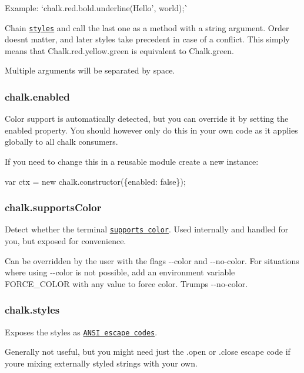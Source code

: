 Example\+: `chalk.\+red.\+bold.\+underline(\textquotesingle{}Hello', \textquotesingle{}world\textquotesingle{});\`{}

Chain \href{#styles}{\tt styles} and call the last one as a method with a string argument. Order doesn\textquotesingle{}t matter, and later styles take precedent in case of a conflict. This simply means that {\ttfamily Chalk.\+red.\+yellow.\+green} is equivalent to {\ttfamily Chalk.\+green}.

Multiple arguments will be separated by space.

\subsubsection*{chalk.\+enabled}

Color support is automatically detected, but you can override it by setting the {\ttfamily enabled} property. You should however only do this in your own code as it applies globally to all chalk consumers.

If you need to change this in a reusable module create a new instance\+:


\begin{DoxyCode}
var ctx = new chalk.constructor(\{enabled: false\});
\end{DoxyCode}


\subsubsection*{chalk.\+supports\+Color}

Detect whether the terminal \href{https://github.com/chalk/supports-color}{\tt supports color}. Used internally and handled for you, but exposed for convenience.

Can be overridden by the user with the flags {\ttfamily -\/-\/color} and {\ttfamily -\/-\/no-\/color}. For situations where using {\ttfamily -\/-\/color} is not possible, add an environment variable {\ttfamily F\+O\+R\+C\+E\+\_\+\+C\+O\+L\+OR} with any value to force color. Trumps {\ttfamily -\/-\/no-\/color}.

\subsubsection*{chalk.\+styles}

Exposes the styles as \href{https://github.com/chalk/ansi-styles}{\tt A\+N\+SI escape codes}.

Generally not useful, but you might need just the {\ttfamily .open} or {\ttfamily .close} escape code if you\textquotesingle{}re mixing externally styled strings with your own.


